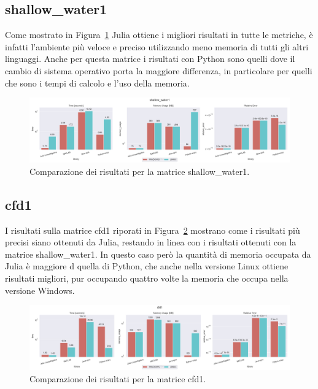 \documentclass{report}
\begin{document}
            \subsection{shallow\_water1}
                Come mostrato in Figura~\ref{fig:shallow_water1} Julia ottiene i
                migliori risultati in tutte le metriche, è infatti l'ambiente
                più veloce e preciso utilizzando meno memoria di tutti gli altri
                linguaggi. Anche per questa matrice i risultati con Python sono
                quelli dove il cambio di sistema operativo porta la maggiore 
                differenza, in particolare per quelli che sono i tempi di 
                calcolo e l'uso della memoria.
                \begin{figure}[h]
                    \includegraphics[width=\textwidth]{shallow_water1}
                    \caption{Comparazione dei risultati per la matrice shallow\_water1.}
                    \label{fig:shallow_water1}
                \end{figure}
            \subsection{cfd1}
                I risultati sulla matrice cfd1 riporati in Figura~\ref{fig:cfd1}
                mostrano come i risultati più precisi siano ottenuti da Julia,
                restando in linea con i risultati ottenuti con la matrice
                shallow\_water1. In questo caso però la quantità di memoria 
                occupata da Julia è maggiore d quella di Python, che anche nella
                versione Linux ottiene risultati migliori, pur occupando quattro
                volte la memoria che occupa nella versione Windows.
                \begin{figure}[h]
                    \includegraphics[width=\textwidth]{cfd1}
                    \caption{Comparazione dei risultati per la matrice cfd1.}
                    \label{fig:cfd1}
                \end{figure}
\end{document}
